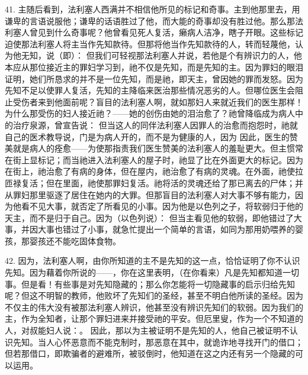 41. 主随后看到，法利塞人西满并不相信他所见的标记和奇事。主到他那里去，用谦卑的言语说服他；谦卑的话语胜过了他，而大能的奇事却没有胜过他。那么那法利塞人曾见到什么奇事呢？他曾看见死人复活，癞病人洁净，瞎子开眼。这些标记迫使那法利塞人将主当作先知款待。但那将他当作先知款待的人，转而轻蔑他，认为他无知，说（即）： 但我们可轻视那法利塞人并说，若他是个有辨识力的人，他本应从那位接近主的罪妇学习到，祂不仅是先知，而是先知的主。因为罪妇的眼泪证明，她们所恳求的并不是一位先知，而是祂，即天主，曾因她的罪而发怒。因为先知不足以使罪人复活，先知的主降临来医治那些情况恶劣的人。但哪位医生会阻止受伤者来到他面前呢？盲目的法利塞人啊，就如那妇人来就近我们的医生那样！为什么那受伤的妇人接近祂？——她的创伤由她的泪治愈了？祂曾降临成为病人中的治疗泉源，曾宣告说： 但当这人的同伴法利塞人因罪人的治愈而抱怨时，祂就自己的医术教导说，门是为病人开的，而不是为健康的人，因为 因此，医生的赞美就是病人的痊愈——为使那指责我们医生赞美的法利塞人的羞耻更大。但主惯常在街上显标记；而当祂进入法利塞人的屋子时，祂显了比在外面更大的标记。因为在街上，祂治愈了有病的身体，但在屋内，祂治愈了有病的灵魂。在外面，祂使拉匝禄复活；但在里面，祂使那罪妇复活。祂将活的灵魂还给了那已离去的尸体；并从罪妇那里驱逐了居住在她内的大罪。但那盲目的法利塞人对大事不够有能力，因为他看不见大事，就否定了所看见的小事。因为他是以色列之子，将软弱归于他的天主，而不是归于自己。因为（以色列说）： 但当主看见他的软弱，即他错过了大事，并因大事也错过了小事，就急忙提出一个简单的言语，如同为那用奶喂养的婴孩，那婴孩还不能吃固体食物。\par

42. 因为，法利塞人啊，由你所知道的主不是先知的这一点，恰恰证明了你不认识先知。因为藉着你所说的——，你在这里表明，（在你看来）凡是先知都知道一切事。但是看！有些事是对先知隐藏的；那么你怎能将一切隐藏事的启示归给先知呢？但这不明智的教师，他败坏了先知们的圣经，甚至不明白他所读的圣经。因为不仅主的伟大没有被那法利塞人辨识，他甚至没有辨识先知们的软弱。因为我们的主，作为全知者，让那个罪妇进来并接受祂的平安。但厄里叟，作为一个不知道的人，对叔能妇人说：。 因此，那以为主被证明不是先知的人，他自己被证明不认识先知。当人心怀恶意而不能克制时，那恶意在其中，就诡诈地寻找开门的借口；但若那借口，即欺骗者的避难所，被驳倒时，他知道在这之内还有另一个隐藏的可以运用。\par

